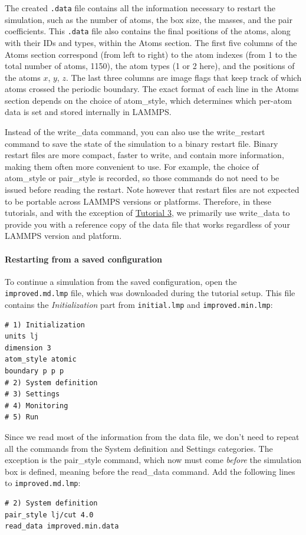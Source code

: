 \documentclass[9pt,tutorial]{livecoms}
\newcommand{\lmpcmd}[1]{\colorbox{listing}{\textcolor{command}{\small{#1}}}} %
\newcommand{\lmpcmdnote}[1]{\colorbox{note_listing}{\textcolor{command}{\small{#1}}}} %
\newcommand{\flecmd}[1]{\textcolor{command}{\texttt{#1}}} %
\begin{document}
The created \flecmd{.data} file contains all the information necessary
to restart the simulation, such as the number of atoms, the box size,
the masses, and the pair coefficients.   {\color{blue}This \flecmd{.data} file also
contains the final positions of the atoms, along with their IDs and types,
within the \lmpcmd{Atoms} section.}  The first five columns of the \lmpcmd{Atoms} section
correspond (from left to right) to the atom indexes (from 1 to the total
number of atoms, 1150), the atom types (1 or 2 here), and the positions
of the atoms $x$, $y$, $z$.  The last three columns are image flags that
keep track of which atoms crossed the periodic boundary.  The exact
format of each line in the \lmpcmd{Atoms} section depends on the choice
of \lmpcmd{atom\_style}, which determines which per-atom data is set and
stored internally in LAMMPS.

\begin{note}
Instead of the \lmpcmdnote{write\_data} command, you can also use the
\lmpcmdnote{write\_restart} command to save the state
of the simulation to a binary restart file.  Binary restart files are
more compact, faster to write, and contain more information, making them often
more convenient to use.  For example, the choice of \lmpcmdnote{atom\_style}
or \lmpcmdnote{pair\_style} is recorded, so those commands do not need to be issued
before reading the restart.  Note however that restart files are not expected to be
portable across LAMMPS versions or platforms.  Therefore, in these tutorials,
and with the exception of \hyperref[all-atom-label]{Tutorial 3}, we primarily use \lmpcmdnote{write\_data} to provide you with a reference
copy of the data file that works regardless of your LAMMPS version and platform.
\end{note}

\paragraph{Restarting from a saved configuration}

To continue a simulation from the saved configuration, open the
\flecmd{improved.md.lmp} file, which was downloaded during the tutorial setup.
This file contains the \textit{Initialization} part from \flecmd{initial.lmp}
and \flecmd{improved.min.lmp}:
\begin{lstlisting}
# 1) Initialization
units lj
dimension 3
atom_style atomic
boundary p p p
# 2) System definition
# 3) Settings
# 4) Monitoring
# 5) Run
\end{lstlisting}
Since we read most of the information from the data file, we don't need
to repeat all the commands from the \lmpcmd{System definition}
and \lmpcmd{Settings} categories.  The exception is the \lmpcmd{pair\_style}
command, which now must come \emph{before} the simulation box is defined,
meaning before the \lmpcmd{read\_data} command.  Add the following
lines to \flecmd{improved.md.lmp}:
\begin{lstlisting}
# 2) System definition
pair_style lj/cut 4.0
read_data improved.min.data
\end{lstlisting}
\end{document}
